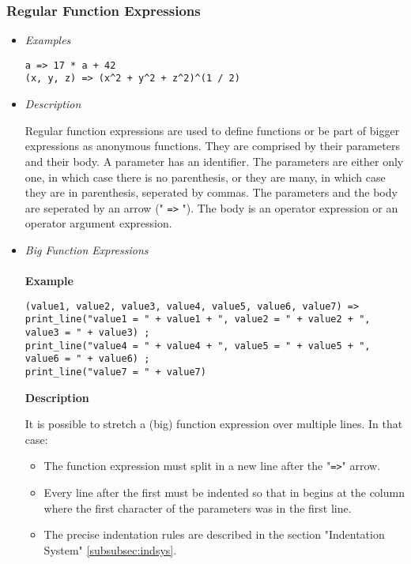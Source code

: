 \documentclass{article}
\begin{document}
\subsubsection{Regular Function Expressions}

\begin{itemize}
\item \textit{Examples}

\begin{verbatim}
a => 17 * a + 42
(x, y, z) => (x^2 + y^2 + z^2)^(1 / 2)
\end{verbatim}

\item \textit{Description}

Regular function expressions are used to define functions or be part of bigger
expressions as anonymous functions. They are comprised by their parameters and
their body. A parameter has an identifier. The parameters are either
only one, in which case there is no parenthesis, or they are many, in which
case they are in parenthesis, seperated by commas. The parameters and the body
are seperated by an arrow (" \texttt{=>} "). The body is an operator
expression or an operator argument expression.

\item \textit{Big Function Expressions}\\\\
\textbf{Example}

\begin{verbatim}
(value1, value2, value3, value4, value5, value6, value7) => 
print_line("value1 = " + value1 + ", value2 = " + value2 + ", value3 = " + value3) ;
print_line("value4 = " + value4 + ", value5 = " + value5 + ", value6 = " + value6) ;
print_line("value7 = " + value7)
\end{verbatim}

\textbf{Description}

It is possible to stretch a (big) function expression over multiple lines.
In that case:
\begin{itemize}
\item
The function expression must split in a new line after the "\texttt{=>}" arrow.

\item
Every line after the first must be indented so that in begins at the column 
where the first character of the parameters was in the first line.

\item
The precise indentation rules are described in the section
"Indentation System" \ref{subsubsec:indsys}.
\end{itemize}


\end{itemize}
\end{document}
